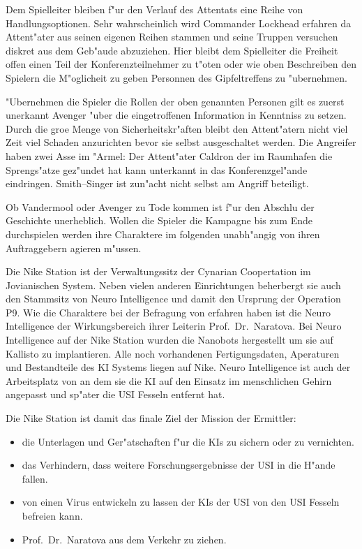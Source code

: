 \begin{remarks}
	Dem Spielleiter bleiben f"ur den Verlauf des Attentats eine Reihe von Handlungsoptionen. Sehr wahrscheinlich wird Commander Lockhead erfahren da\3 Attent"ater aus seinen eigenen Reihen stammen und seine Truppen versuchen diskret aus dem Geb"aude abzuziehen. Hier bleibt dem Spielleiter die Freiheit offen einen Teil der Konferenzteilnehmer zu t"oten oder wie oben Beschreiben den Spielern die M"oglicheit zu geben Personnen des Gipfeltreffens zu "ubernehmen.
	
	"Ubernehmen die Spieler die Rollen der oben genannten Personen gilt es zuerst unerkannt Avenger "uber die eingetroffenen Information in Kenntniss zu setzen. Durch die gro\3e Menge von Sicherheitskr"aften bleibt den Attent"atern nicht viel Zeit viel Schaden anzurichten bevor sie selbst ausgeschaltet werden. Die Angreifer haben zwei Asse im "Armel: Der Attent"ater Caldron der im Raumhafen die Sprengs"atze gez"undet hat kann unterkannt in das Konferenzgel"ande eindringen. Smith--Singer ist zun"acht nicht selbst am Angriff beteiligt.
	
	Ob Vandermool oder Avenger zu Tode kommen ist f"ur den Abschlu\3 der Geschichte unerheblich. Wollen die Spieler die Kampagne bis zum Ende durchspielen werden ihre Charaktere im folgenden unabh"angig von ihren Auftraggebern agieren m"ussen.
\end{remarks}



Die Nike Station ist der Verwaltungssitz der Cynarian Coopertation im Jovianischen System. Neben vielen anderen Einrichtungen beherbergt sie auch den Stammsitz von Neuro Intelligence und damit den Ursprung der Operation P9. Wie die Charaktere bei der Befragung von \ml{} erfahren haben ist die Neuro Intelligence der Wirkungsbereich ihrer Leiterin Prof.~Dr.~Naratova. Bei Neuro Intelligence auf der Nike Station wurden die Nanobots hergestellt um sie auf Kallisto zu implantieren. Alle noch vorhandenen Fertigungsdaten, Aperaturen und Bestandteile des KI Systems liegen auf Nike. Neuro Intelligence ist auch der Arbeitsplatz von \ml{} an dem sie die KI auf den Einsatz im menschlichen Gehirn angepasst und sp"ater die USI Fesseln entfernt hat.

Die Nike Station ist damit das finale Ziel der Mission der Ermittler:

\begin{itemize}
	\item die Unterlagen und Ger"atschaften f"ur die KIs zu sichern oder zu vernichten.
	\item das Verhindern, dass weitere Forschungsergebnisse der USI in die H"ande fallen.
	\item von \ml{} einen Virus entwickeln zu lassen der KIs der USI von den USI Fesseln befreien kann.
	\item Prof.~Dr.~Naratova aus dem Verkehr zu ziehen.
\end{itemize}

